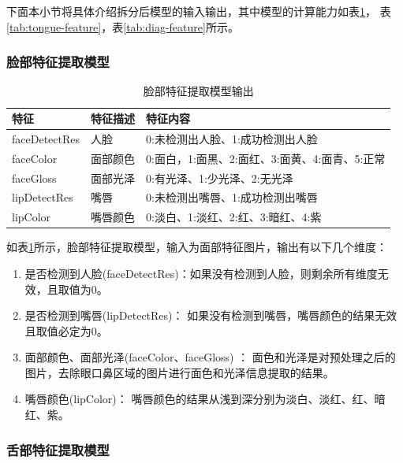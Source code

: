下面本小节将具体介绍拆分后模型的输入输出，其中模型的计算能力如表\ref{tab:face-feature}， 表\ref{tab:tongue-feature}，表\ref{tab:diag-feature}所示。
\subsubsection{脸部特征提取模型}

\begin{table}[h]
    \centering
    \caption{脸部特征提取模型输出}
    \begin{tabular}{lll}
        \toprule
        特征          & 特征描述     & 特征内容 \\ 
        \midrule
        faceDetectRes & 人脸   & 0:未检测出人脸、1:成功检测出人脸  \\
        faceColor     & 面部颜色 & 0:面白，1:面黑、2:面红、3:面黄、4:面青、5:正常 \\
        faceGloss     & 面部光泽 & 0:有光泽、1:少光泽、2:无光泽\\
        lipDetectRes  & 嘴唇   & 0:未检测出嘴唇、1:成功检测出嘴唇\\
        lipColor      & 嘴唇颜色 & 0:淡白、1:淡红、2:红、3:暗红、4:紫   \\
        \bottomrule
    \end{tabular}
    \label{tab:face-feature}
\end{table}

如表\ref{tab:face-feature}所示，脸部特征提取模型，输入为面部特征图片，输出有以下几个维度：
\begin{enumerate}
    \item 是否检测到人脸(faceDetectRes)：如果没有检测到人脸，则剩余所有维度无效，且取值为0。

    \item 是否检测到嘴唇(lipDetectRes)： 如果没有检测到嘴唇，嘴唇颜色的结果无效且取值必定为0。

    \item 面部颜色、面部光泽(faceColor、faceGloss) ： 面色和光泽是对预处理之后的图片，去除眼口鼻区域的图片进行面色和光泽信息提取的结果。

    \item 嘴唇颜色(lipColor)： 嘴唇颜色的结果从浅到深分别为淡白、淡红、红、暗红、紫。
\end{enumerate}


\subsubsection{舌部特征提取模型}

